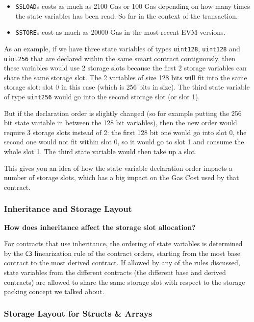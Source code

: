 \begin{itemize}
\tightlist
\item
  \texttt{SSLOAD}s costs as much as 2100 Gas or 100 Gas depending on how
  many times the state variables has been read. So far in the context of
  the transaction.
\item
  \texttt{SSTORE}s cost as much as 20000 Gas in the most recent EVM
  versions.
\end{itemize}

As an example, if we have three state variables of types
\texttt{uint128}, \texttt{uint128} and \texttt{uint256} that are
declared within the same smart contract contiguously, then these
variables would use 2 storage slots because the first 2 storage
variables can share the same storage slot. The 2 variables of size 128
bits will fit into the same storage slot: slot 0 in this case (which is
256 bits in size). The third state variable of type \texttt{uint256}
would go into the second storage slot (or slot 1).

But if the declaration order is slightly changed (so for example putting
the 256 bit state variable in between the 128 bit variables), then the
new order would require 3 storage slots instead of 2: the first 128 bit
one would go into slot 0, the second one would not fit within slot 0, so
it would go to slot 1 and consume the whole slot 1. The third state
variable would then take up a slot.

This gives you an idea of how the state variable declaration order
impacts a number of storage slots, which has a big impact on the Gas
Cost used by that contract.

\subsubsection{Inheritance and Storage
Layout}\label{inheritance-and-storage-layout}

\textbf{How does inheritance affect the storage slot allocation?}

For contracts that use inheritance, the ordering of state variables is
determined by the \texttt{C3} linearization rule of the contract orders,
starting from the most base contract to the most derived contract. If
allowed by any of the rules discussed, state variables from the
different contracts (the different base and derived contracts) are
allowed to share the same storage slot with respect to the storage
packing concept we talked about.

\subsubsection{Storage Layout for Structs \&
Arrays}\label{storage-layout-for-structs-arrays}

